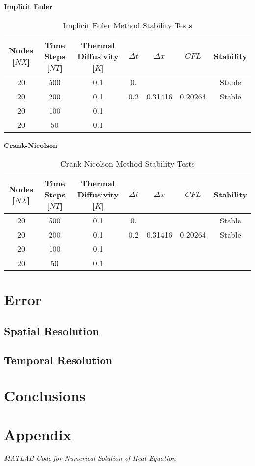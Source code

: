 \documentclass[10pt, letter, showtrims]{extarticle}
\begin{document}
		\noindent
		\textbf{Implicit Euler}
		
		\begin{table}[h]
			\caption{Implicit Euler Method Stability Tests}
			\centering
			\begin{tabular}{|c|c|c|c|c|c|c|}
				\hline
				Nodes [$NX$] & Time Steps [$NT$] & Thermal Diffusivity [$K$] & $\Delta t$ & $\Delta x$ & $CFL$ & Stability \\
				\hline \rowcolor{Gray} 
				20 & 500 & 0.1 & 0.  &         &         & Stable \\
				\hline
				20 & 200 & 0.1 & 0.2 & 0.31416 & 0.20264 & Stable \\
				\hline \rowcolor{Gray} 
				20 & 100 & 0.1 &     &         &         &        \\
				\hline
				20 & 50  & 0.1 &     &         &         &        \\
				\hline
			\end{tabular}
		\end{table}
		
		\noindent
		\textbf{Crank-Nicolson}
		
		\begin{table}[h]
			\caption{Crank-Nicolson Method Stability Tests}
			\centering
			\begin{tabular}{|c|c|c|c|c|c|c|}
				\hline
				Nodes [$NX$] & Time Steps [$NT$] & Thermal Diffusivity [$K$] & $\Delta t$ & $\Delta x$ & $CFL$ & Stability \\
				\hline \rowcolor{Gray} 
				20 & 500 & 0.1 & 0.  &         &         & Stable \\
				\hline
				20 & 200 & 0.1 & 0.2 & 0.31416 & 0.20264 & Stable \\
				\hline \rowcolor{Gray} 
				20 & 100 & 0.1 &     &         &         &        \\
				\hline
				20 & 50  & 0.1 &     &         &         &        \\
				\hline
			\end{tabular}
		\end{table}
		
		\pagebreak
		
		\section{Error}
		
		\subsection{Spatial Resolution}
		
		\pagebreak
		
		\subsection{Temporal Resolution}
		
		\pagebreak
		
		\section{Conclusions}
		
		\pagebreak	
	
	\section{Appendix}
	
	\centerline{\textit{MATLAB Code for Numerical Solution of Heat Equation}}
	
	
\end{document}

